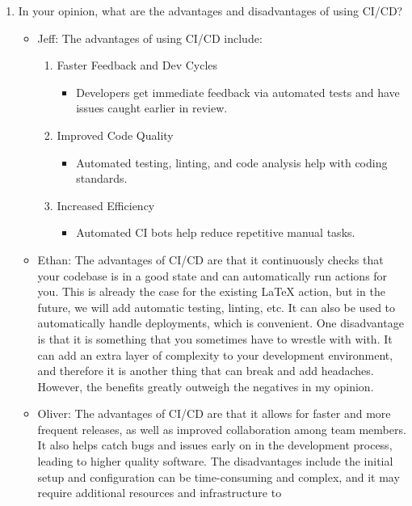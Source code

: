 \documentclass{article}
\begin{document}
\begin{enumerate}
    \item In your opinion, what are the advantages and disadvantages of using
    CI/CD?
	\begin{itemize}
		\item Jeff: The advantages of using CI/CD include: 
    \begin{enumerate}
      \item Faster Feedback and Dev Cycles
      \begin{itemize}
        \item Developers get immediate feedback via automated tests 
        and have issues caught earlier in review.
      \end{itemize}
      \item Improved Code Quality
      \begin{itemize}
        \item Automated testing, linting, and code analysis help
        with coding standards.
      \end{itemize}
      \item Increased Efficiency
      \begin{itemize}
        \item Automated CI bots help reduce repetitive manual tasks.
      \end{itemize}
    \end{enumerate}
    \item Ethan: The advantages of CI/CD are that it continuously checks that
      your codebase is in a good state and can automatically run actions for
      you. This is already the case for the existing LaTeX action, but in the
      future, we will add automatic testing, linting, etc. It can also be used
      to automatically handle deployments, which is convenient. One
      disadvantage is that it is something that you sometimes have to wrestle with
      with. It can add an extra layer of complexity to your development
      environment, and therefore it is another thing that can break and add
      headaches. However, the benefits greatly outweigh the negatives in my
      opinion.
		\item Oliver: The advantages of CI/CD are that it allows for 
    faster and more frequent releases, as well as improved collaboration 
    among team members. It also helps catch bugs and issues early on in the 
    development process, leading to higher quality software. The disadvantages 
    include the initial setup and configuration can be time-consuming and 
    complex, and it may require additional resources and infrastructure to 

\end{itemize}
\end{enumerate}
\end{document}
